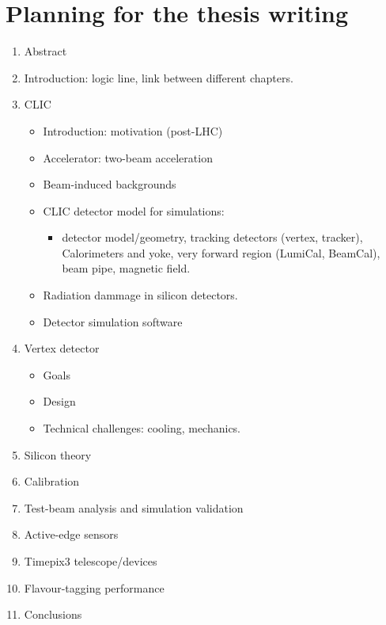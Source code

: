 \chapter{Planning for the thesis writing}

\begin{enumerate}

\item Abstract

\item Introduction: logic line, link between different chapters.

\item CLIC
  \begin{itemize}
  \item Introduction: motivation (post-LHC)
  \item Accelerator: two-beam acceleration
  \item Beam-induced backgrounds
  \item CLIC detector model for simulations:
    \begin{itemize} 
    \item detector model/geometry, tracking detectors (vertex, tracker), Calorimeters and yoke, very forward region (LumiCal, BeamCal), beam pipe, magnetic field.
    \end{itemize}
  \item Radiation dammage in silicon detectors.
  \item Detector simulation software
  \end{itemize}

\item Vertex detector
  \begin{itemize} 
  \item Goals
  \item Design
  \item Technical challenges: cooling, mechanics.
  \end{itemize}

\item Silicon theory

\item Calibration

\item Test-beam analysis and simulation validation

\item Active-edge sensors

\item Timepix3 telescope/devices

\item Flavour-tagging performance

\item Conclusions

\end{enumerate}